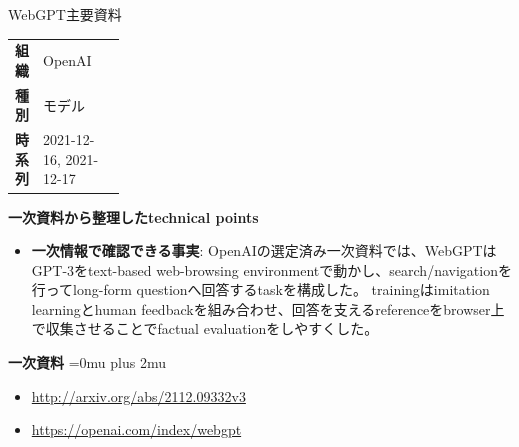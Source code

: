 \begin{technicalnote}{WebGPT}{主要資料}
\begingroup
\begin{tabularx}{\linewidth}{@{}>{\bfseries}p{0.22\linewidth}X@{}}
組織 & OpenAI \\
種別 & モデル \\
時系列 & 2021-12-16, 2021-12-17 \\
\end{tabularx}
\smallskip
{\bfseries 一次資料から整理したtechnical points}
\begin{itemize}[leftmargin=1.5em,itemsep=0.35em]
\item \textbf{一次情報で確認できる事実}: OpenAIの選定済み一次資料では、WebGPTはGPT-3をtext-based web-browsing environmentで動かし、search/navigationを行ってlong-form questionへ回答するtaskを構成した。 trainingはimitation learningとhuman feedbackを組み合わせ、回答を支えるreferenceをbrowser上で収集させることでfactual evaluationをしやすくした。
\end{itemize}
\begin{minipage}{\linewidth}
\begin{samepage}
{\bfseries 一次資料}
\begingroup\sloppy
\Urlmuskip=0mu plus 2mu\relax
\begin{itemize}[leftmargin=1.5em,itemsep=0.25em]
\item {\scriptsize\url{http://arxiv.org/abs/2112.09332v3}}
\item {\scriptsize\url{https://openai.com/index/webgpt}}
\end{itemize}
\endgroup
\end{samepage}
\end{minipage}
\endgroup
\end{technicalnote}
\medskip
